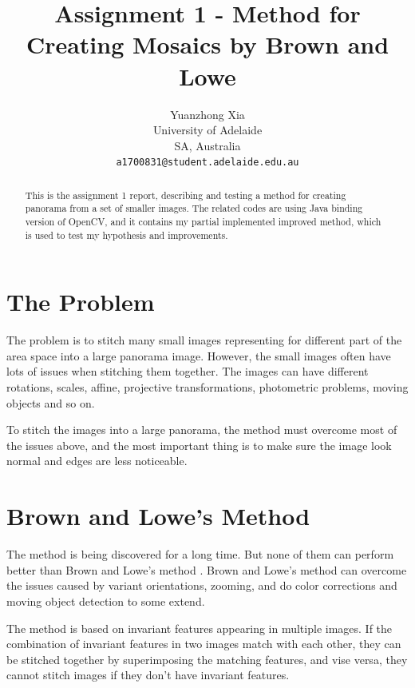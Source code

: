 \documentclass[10pt,twocolumn,letterpaper]{article}
\begin{document}
\title{Assignment 1 - Method for Creating Mosaics by Brown and Lowe}
\author{Yuanzhong Xia\\
University of Adelaide\\
SA, Australia\\
{\tt\small a1700831@student.adelaide.edu.au}
}
\maketitle

\begin{abstract}
This is the assignment 1 report, describing and testing a method for creating panorama from a set of smaller images.
The related codes are using Java binding version of OpenCV, and it contains my partial implemented improved method, which is used to test my hypothesis and improvements.
\end{abstract}


\section{The Problem}
The problem is to stitch many small images representing for different part of the area space into a large panorama image.
However, the small images often have lots of issues when stitching them together.
The images can have different rotations, scales, affine, projective transformations, photometric problems, moving objects and so on.

To stitch the images into a large panorama, the method must overcome most of the issues above,
and the most important thing is to make sure the image look normal and edges are less noticeable.


\section{Brown and Lowe's Method}
The method is being discovered for a long time. But none of them can perform better than Brown and Lowe's method \cite{origin}.
Brown and Lowe's method can overcome the issues caused by variant orientations, zooming, and do color corrections and moving object detection to some extend.

The method is based on invariant features appearing in multiple images. If the combination of invariant features in two images match with each other,
they can be stitched together by superimposing the matching features, and vise versa, they cannot stitch images if they don't have invariant features. 
\end{document}
